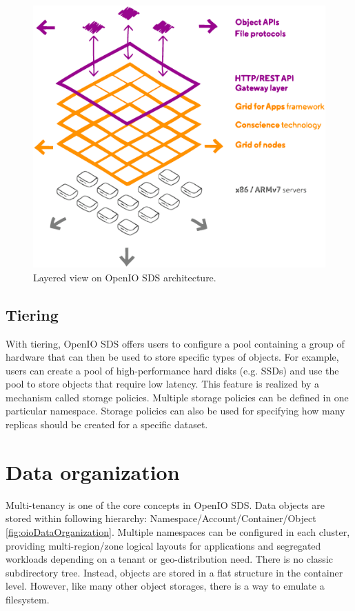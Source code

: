     \begin{figure}[hbt]
        \centering
        \includegraphics[width=1\textwidth]{obrazky-figures/openio-architecture.eps}
        \caption{Layered view on OpenIO SDS architecture.\cite{oioArch}}
        \label{fig:oioArch}
    \end{figure}


    \subsection*{Tiering}
    With tiering, OpenIO SDS offers users to configure a pool containing a group of hardware that can then be used to store specific types of objects. For example, users can create a pool of high-performance hard disks (e.g. SSDs) and use the pool to store objects that require low latency.
    This feature is realized by a mechanism called storage policies. Multiple storage policies can be defined in one particular namespace. Storage policies can also be used for specifying how many replicas should be created for a specific dataset\cite{oioCoreSolution}.

    \section{Data organization}
    Multi-tenancy is one of the core concepts in OpenIO SDS. Data objects are stored within following hierarchy: Namespace/Account/Container/Object \ref{fig:oioDataOrganization}. Multiple namespaces can be configured in each cluster, providing multi-region/zone logical layouts for applications and segregated workloads depending on a tenant or geo-distribution need\cite{oioSdsConcepts}.
    There is no classic subdirectory tree. Instead, objects are stored in a flat structure in the container level. However, like many other object storages, there is a way to emulate a filesystem.

